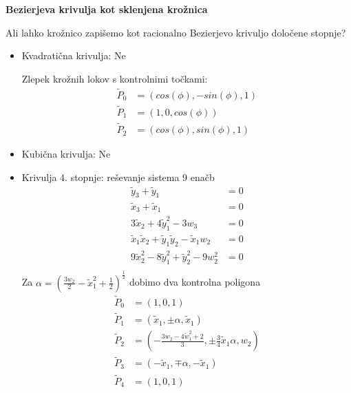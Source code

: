 \documentclass[t]{beamer}
\begin{document}
\begin{frame}
\textbf{Bezierjeva krivulja kot sklenjena krožnica}

Ali lahko krožnico zapišemo kot racionalno Bezierjevo krivuljo določene stopnje?
\begin{itemize}
\item Kvadratična krivulja: Ne

Zlepek krožnih lokov s kontrolnimi točkami:
\begin{align*}
\tilde{P}_0 &= (cos(\phi), -sin(\phi), 1)\\
\tilde{P}_1 &= (1, 0, cos(\phi))\\
\tilde{P}_2 &= (cos(\phi), sin(\phi), 1)
\end{align*}

\item Kubična krivulja: Ne
\end{itemize}
\end{frame}
\begin{frame}
\begin{itemize}
\item Krivulja 4. stopnje: reševanje sistema 9 enačb
\begin{align*}
\tilde{y}_3 + \tilde{y}_1 &= 0\\
\tilde{x}_3 + \tilde{x}_1 &= 0\\
3\tilde{x}_2 + 4\tilde{y}_1^2 - 3w_3 &= 0 \\
\tilde{x}_1\tilde{x}_2 + \tilde{y}_1\tilde{y}_2  - \tilde{x}_1w_2 &= 0 \\
9\tilde{x}_2^2 - 8\tilde{y}_1^2 + \tilde{y}_2^2 - 9w_2^2&= 0 \\
\end{align*}
Za $\alpha = (\frac{3w_2}{2} - \tilde{x}_1^2 + \frac{1}{2})^{\frac{1}{2}}$ dobimo dva kontrolna poligona
\begin{align*}
\tilde{P}_0 &= (1,0, 1)\\
\tilde{P}_1 &= (\tilde{x}_1, \pm \alpha,\tilde{x}_1)\\
\tilde{P}_2 &= (-\frac{3w_2 - 4\tilde{w}_1^2+2}{3}, \pm \frac{3}{4}\tilde{x}_1\alpha, w_2)\\
\tilde{P}_3 &= (-\tilde{x}_1, \mp \alpha,-\tilde{x}_1)\\
\tilde{P}_4 &= (1,0,1) \\
\end{align*}
\end{itemize}

\end{frame}
\end{document}
